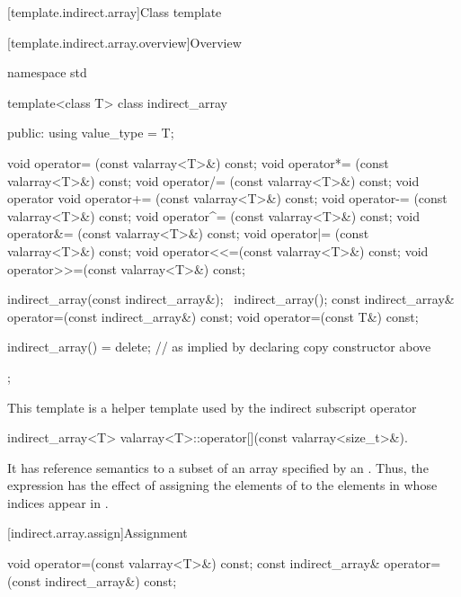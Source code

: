 [template.indirect.array]{Class template }

[template.indirect.array.overview]{Overview}

%
%
\begin{codeblock}
namespace std {
  template<class T> class indirect_array {
  public:
    using value_type = T;

    void operator=  (const valarray<T>&) const;
    void operator*= (const valarray<T>&) const;
    void operator/= (const valarray<T>&) const;
    void operator%
    void operator+= (const valarray<T>&) const;
    void operator-= (const valarray<T>&) const;
    void operator^= (const valarray<T>&) const;
    void operator&= (const valarray<T>&) const;
    void operator|= (const valarray<T>&) const;
    void operator<<=(const valarray<T>&) const;
    void operator>>=(const valarray<T>&) const;

    indirect_array(const indirect_array&);
    ~indirect_array();
    const indirect_array& operator=(const indirect_array&) const;
    void operator=(const T&) const;

    indirect_array() = delete;  // as implied by declaring copy constructor above
  };
}
\end{codeblock}

\pnum
This template is a helper template used by the indirect subscript operator
%
\begin{itemdecl}
indirect_array<T> valarray<T>::operator[](const valarray<size_t>&).
\end{itemdecl}

\pnum
It has reference semantics to a subset of an array specified by an
.
Thus, the expression
has the effect of assigning the elements of
to the elements in
whose indices appear in
.

[indirect.array.assign]{Assignment}

%
\begin{itemdecl}
void operator=(const valarray<T>&) const;
const indirect_array& operator=(const indirect_array&) const;
\end{itemdecl}

